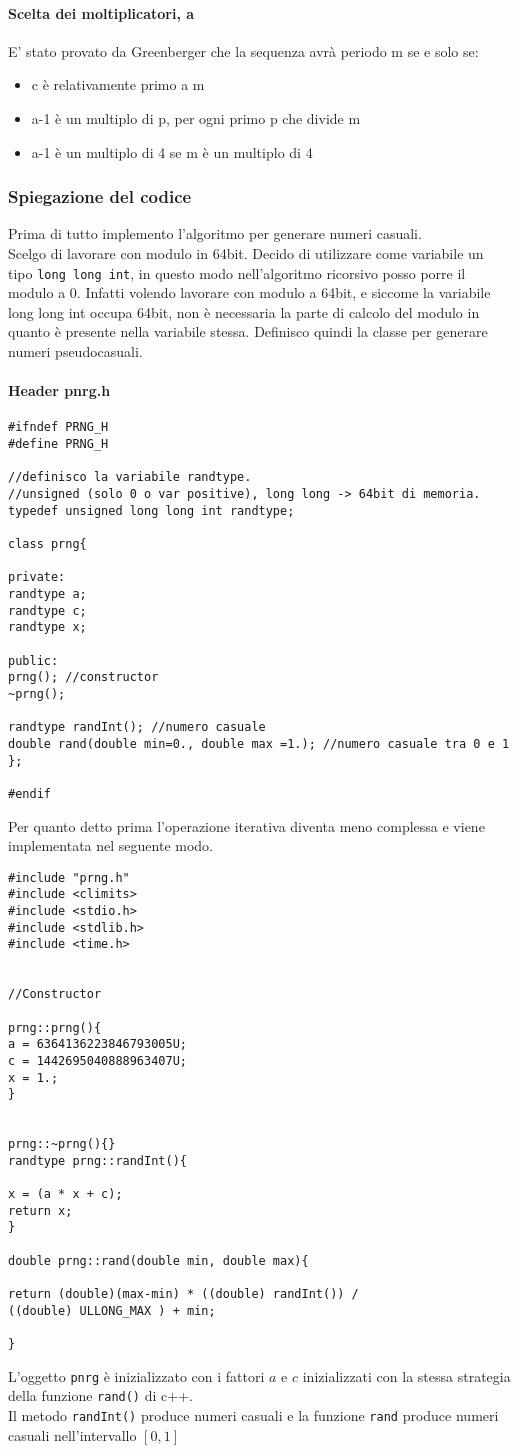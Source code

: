 \documentclass[10pt,a4paper]{book}
\begin{document}
\paragraph{Scelta dei moltiplicatori, a}
E' stato provato da Greenberger che la sequenza avrà periodo m se e solo se: 
\begin{itemize}
	\item c è relativamente primo a m
	\item a-1 è un multiplo di p, per ogni primo p che divide m
	\item a-1 è un multiplo di 4 se m è un multiplo di 4
\end{itemize}
\subsubsection{Spiegazione del codice}
Prima di tutto implemento l'algoritmo per generare numeri casuali.\\
Scelgo di lavorare con modulo in 64bit. Decido di utilizzare come variabile un tipo \verb|long long int|, in questo modo nell'algoritmo ricorsivo posso porre il modulo a 0. Infatti volendo lavorare con modulo a 64bit, e siccome la variabile long long int occupa 64bit, non è necessaria la parte di calcolo del modulo in quanto è presente nella variabile stessa.
Definisco quindi la classe per generare numeri pseudocasuali.
\paragraph{Header pnrg.h}
\begin{verbatim}
#ifndef PRNG_H
#define PRNG_H

//definisco la variabile randtype. 
//unsigned (solo 0 o var positive), long long -> 64bit di memoria.
typedef unsigned long long int randtype;

class prng{

private:
randtype a;
randtype c;
randtype x;

public:
prng(); //constructor
~prng(); 

randtype randInt(); //numero casuale
double rand(double min=0., double max =1.); //numero casuale tra 0 e 1
};

#endif
\end{verbatim}
Per quanto detto prima l'operazione iterativa diventa meno complessa e viene implementata nel seguente modo.
\begin{verbatim}
#include "prng.h"
#include <climits>
#include <stdio.h>
#include <stdlib.h>
#include <time.h>


//Constructor 

prng::prng(){
a = 6364136223846793005U;
c = 1442695040888963407U;
x = 1.;
}


prng::~prng(){}
randtype prng::randInt(){

x = (a * x + c);
return x;
}

double prng::rand(double min, double max){

return (double)(max-min) * ((double) randInt()) /
((double) ULLONG_MAX ) + min;

}
\end{verbatim}

L'oggetto \texttt{pnrg} è inizializzato con i fattori $a$ e $c$ inizializzati con la stessa strategia della funzione \texttt{rand()} di c++. \\
Il metodo \texttt{randInt()} produce numeri casuali e la funzione \texttt{rand} produce numeri casuali nell'intervallo $[0,1]$
\end{document}
